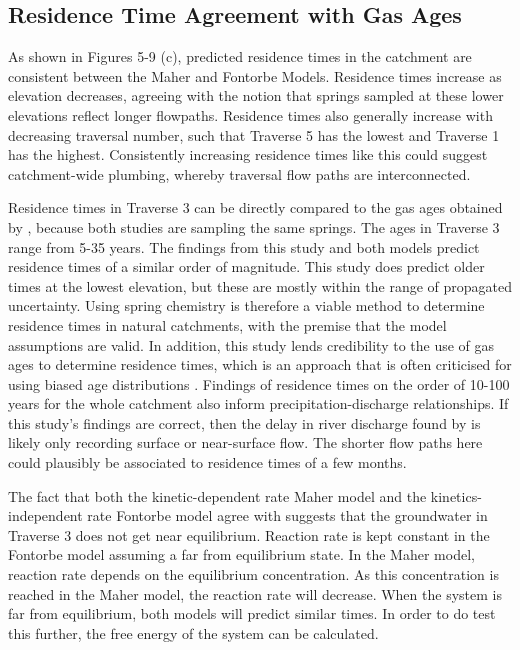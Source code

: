 \subsection{Residence Time Agreement with Gas Ages}

As shown in Figures 5-9 (c), predicted residence times in the catchment are consistent between the Maher and Fontorbe Models. Residence times increase as elevation decreases, agreeing with the notion that springs sampled at these lower elevations reflect longer flowpaths. Residence times also generally increase with decreasing traversal number, such that Traverse 5 has the lowest and Traverse 1 has the highest. Consistently increasing residence times like this could suggest catchment-wide plumbing, whereby traversal flow paths are interconnected.

\bsk

Residence times in Traverse 3 can be directly compared to the gas ages obtained by \textcite{atwoodCriticalZoneResponse2023}, because both studies are sampling the same springs. The \textcite{atwoodCriticalZoneResponse2023} ages in Traverse 3 range from 5-35 years. The findings from this study and both models predict residence times of a similar order of magnitude. This study does predict older times at the lowest elevation, but these are mostly within the range of propagated uncertainty. Using spring chemistry is therefore a viable method to determine residence times in natural catchments, with the premise that the model assumptions are valid. In addition, this study lends credibility to the use of gas ages to determine residence times, which is an approach that is often criticised for using biased age distributions \parencite{mccallumLimitationsUseEnvironmental2015}. Findings of residence times on the order of 10-100 years for the whole catchment also inform precipitation-discharge relationships. If this study's findings are correct, then the delay in river discharge found by \textcite{andermannImpactTransientGroundwater2012} is likely only recording surface or near-surface flow. The shorter flow paths here could plausibly be associated to residence times of a few months.

\bsk

The fact that both the kinetic-dependent rate Maher model and the kinetics-independent rate Fontorbe model agree with \textcite{atwoodCriticalZoneResponse2023} suggests that the groundwater in Traverse 3 does not get near equilibrium. Reaction rate is kept constant in the Fontorbe model assuming a far from equilibrium state. In the Maher model, reaction rate depends on the equilibrium concentration. As this concentration is reached in the Maher model, the reaction rate will decrease. When the system is far from equilibrium, both models will predict similar times. In order to do test this further, the free energy of the system can be calculated.


